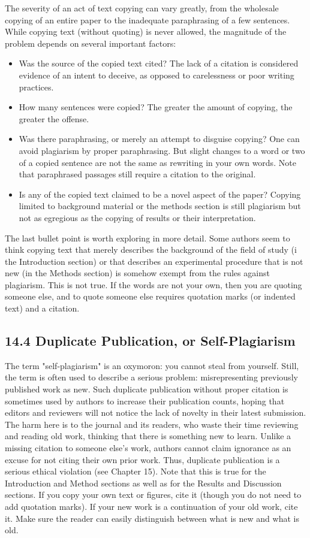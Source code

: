 The severity of an act of text copying can vary greatly, from the wholesale copying of an entire paper to the inadequate paraphrasing of a few sentences. While copying text (without quoting) is never allowed, the magnitude of the problem depends on several important factors:

\begin{itemize}
  \item Was the source of the copied text cited? The lack of a citation is considered evidence of an intent to deceive, as opposed to carelessness or poor writing practices.
  \item How many sentences were copied? The greater the amount of copying, the greater the offense.
  \item Was there paraphrasing, or merely an attempt to disguise copying? One can avoid plagiarism by proper paraphrasing. But slight changes to a word or two of a copied sentence are not the same as rewriting in your own words. Note that paraphrased passages still require a citation to the original.
  \item Is any of the copied text claimed to be a novel aspect of the paper? Copying limited to background material or the methods section is still plagiarism but not as egregious as the copying of results or their interpretation.
\end{itemize}

The last bullet point is worth exploring in more detail. Some authors seem to think copying text that merely describes the background of the field of study (i the Introduction section) or that describes an experimental procedure that is not new (in the Methods section) is somehow exempt from the rules against plagiarism. This is not true. If the words are not your own, then you are quoting someone else, and to quote someone else requires quotation marks (or indented text) and a citation.

\subsection*{14.4 Duplicate Publication, or Self-Plagiarism}
The term "self-plagiarism" is an oxymoron: you cannot steal from yourself. Still, the term is often used to describe a serious problem: misrepresenting previously published work as new. Such duplicate publication without proper citation is sometimes used by authors to increase their publication counts, hoping that editors and reviewers will not notice the lack of novelty in their latest submission. The harm here is to the journal and its readers, who waste their time reviewing and reading old work, thinking that there is something new to learn. Unlike a missing citation to someone else's work, authors cannot claim ignorance as an excuse for not citing their own prior work. Thus, duplicate publication is a serious ethical violation (see Chapter 15). Note that this is true for the Introduction and Method sections as well as for the Results and Discussion sections. If you copy your own text or figures, cite it (though you do not need to add quotation marks). If your new work is a continuation of your old work, cite it. Make sure the reader can easily distinguish between what is new and what is old.

